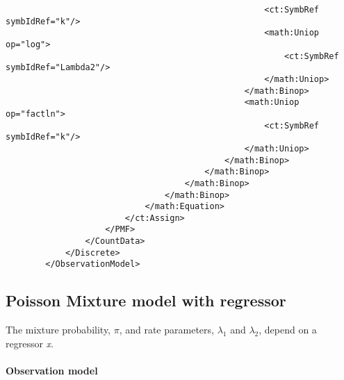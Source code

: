 \begin{lstlisting}
                                                    <ct:SymbRef symbIdRef="k"/>
                                                    <math:Uniop op="log">
                                                        <ct:SymbRef symbIdRef="Lambda2"/>
                                                    </math:Uniop>
                                                </math:Binop>
                                                <math:Uniop op="factln">
                                                    <ct:SymbRef symbIdRef="k"/>
                                                </math:Uniop>
                                            </math:Binop>
                                        </math:Binop>
                                    </math:Binop>
                                </math:Binop>
                            </math:Equation>
                        </ct:Assign>
                    </PMF>
                </CountData>
            </Discrete>
        </ObservationModel>
\end{lstlisting}



\subsection{Poisson Mixture model with regressor}
\label{subsec:PMIX2model2}
The mixture probability, $\pi$, and rate parameters, $\lambda_1$ and $\lambda_2$, 
depend on a regressor \emph{x}.

\paragraph{Observation model}

